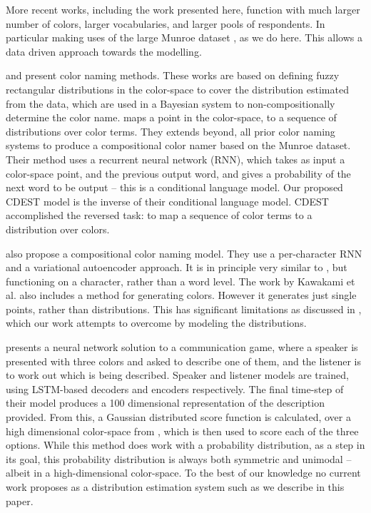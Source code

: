 \documentclass[11pt,a4paper]{article}
\newcommand{\textcite}{\citet}
\begin{document}
More recent works, including the work presented here, function with much larger number of colors, larger vocabularies, and larger pools of respondents.
In particular making uses of the large Munroe dataset \textcite{Munroe2010XKCDdataset}, as we do here.
This allows a data driven approach towards the modelling.

\textcite{mcmahan2015bayesian} and \textcite{meomcmahanstone:color} present color naming methods.
These works are based on defining fuzzy rectangular distributions in the color-space to cover the distribution estimated from the data, which are used in a Bayesian system to non-compositionally determine the color name.
%
%
\textcite{2016arXiv160603821M} maps a point in the color-space, to a sequence of distributions over color terms.
They extends beyond, all prior color naming systems to produce a compositional color namer based on the Munroe dataset.
Their method uses a recurrent neural network (RNN), which takes as input a color-space point, and the previous output word, and gives a probability of the next word to be output -- this is a conditional language model.
Our proposed CDEST model is the inverse of their conditional language model.
CDEST accomplished the reversed task: to map a sequence of color terms to a distribution over colors.


\textcite{DBLP:journals/corr/KawakamiDRS16} also propose a compositional color naming model.
They use a per-character RNN and a variational autoencoder approach.
It is in principle very similar to \textcite{2016arXiv160603821M}, but functioning on a character, rather than a word level.
The work by Kawakami et al. also includes a method for generating colors.
However it generates just single points, rather than distributions.
This has significant limitations as discussed in , which our work attempts to overcome by modeling the distributions.

\textcite{DBLP:journals/corr/MonroeHGP17} presents a neural network solution to a communication game, where a speaker is presented with three colors and asked to describe one of them, and the listener is to work out which is being described.
Speaker and listener models are trained, using LSTM-based decoders and encoders respectively.
The final time-step of their model produces a 100 dimensional representation of the description provided.
From this, a Gaussian distributed score function is calculated, over a high dimensional color-space from \textcite{2016arXiv160603821M}, which is then used to score each of the three options.
While this method does work with a probability distribution, as a step in its goal,
this probability distribution is always both symmetric and unimodal -- albeit in a high-dimensional color-space.
To the best of our knowledge no current work proposes as a distribution estimation system such as we describe in this paper.
\end{document}
